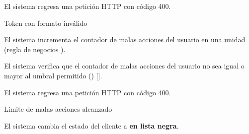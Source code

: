 {\begin{trayectoriaAlternativa}
    \item El sistema regresa una petición HTTP con código 400.

  \end{trayectoriaAlternativa}

  \begin{trayectoriaAlternativa}
    {Token con formato inválido}

    \item El sistema incrementa el contador de malas acciones del usuario
      en una unidad (regla de negocios ).
    \item El sistema verifica que el contador de malas acciones del usuario no
      sea igual o mayor al umbral permitido
      ()
      [].

    \item El sistema regresa una petición HTTP con código 400.

  \end{trayectoriaAlternativa}

  \begin{trayectoriaAlternativa}
    {Límite de malas acciones alcanzado}

    \item El sistema cambia el estado del cliente a \textbf{en lista negra}.

  \end{trayectoriaAlternativa}
}
